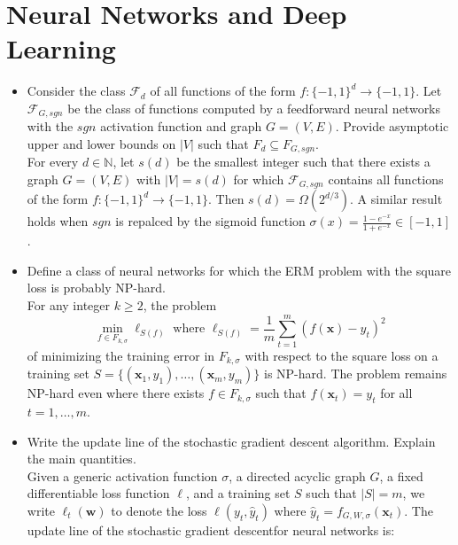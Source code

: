 \newpage
\section{Neural Networks and Deep Learning}

\begin{itemize}

    \item Consider the class $\mathcal{F}_d$ of all functions of the form $f : \{-1, 1\}^d \rightarrow \{-1, 1\}$. Let $\mathcal{F}_{G,sgn}$ be the class of functions computed by a feedforward neural networks with the $sgn$ activation function and graph $G = (V, E)$. Provide asymptotic upper and lower bounds on $|V|$ such that $F_d \subseteq F_{G,sgn}$.\\ 

        For every $d \in \mathbb{N}$, let $s(d)$ be the smallest integer such that there exists a graph $G = (V, E)$ with $|V| = s(d)$ for which $\mathcal{F}_{G, sgn}$ contains all functions of the form $f : \{-1, 1\}^d \rightarrow \{-1, 1\}$. Then $s(d) = \Omega(2^{d/3})$. A similar result holds when $sgn$ is repalced by the sigmoid function $\sigma(x) = \frac{1 - e^{-x}}{1 + e^{-x}} \in [-1,1]$.

    \item Define a class of neural networks for which the ERM problem with the square loss is probably NP-hard.\\

        For any integer $k \geq 2$, the problem
    $$
\min_{f \in F_{k, \sigma}} \ell_{S(f)} \text{ where } \ell_{S(f)} = \frac{1}{m} \sum_{t=1}^m (f(\boldsymbol{x})- y_t)^2
    $$
of minimizing the training error in $F_{k,\sigma}$ with respect to the square loss on a training set $S = \{(\boldsymbol{x}_1,y_1),\dots,(\boldsymbol{x}_m, y_m)\}$ is NP-hard. The problem remains NP-hard even where there exists $f \in F_{k,\sigma}$ such that $f(\boldsymbol{x}_t) = y_t$ for all $t=1,\dots,m$.

    \item Write the update line of the stochastic gradient descent algorithm. Explain the main quantities.\\

        Given a generic activation function $\sigma$, a directed acyclic graph $G$, a fixed differentiable loss function $\ell$, and a training set $S$ such that $|S| = m$, we write $\ell_t(\boldsymbol{w})$ to denote the loss $\ell (y_t, \hat{y}_t)$ where $\hat{y}_t = f_{G, W, \sigma} (\boldsymbol{x}_t)$. The update line of the stochastic gradient descentfor neural networks is:


\end{itemize}
